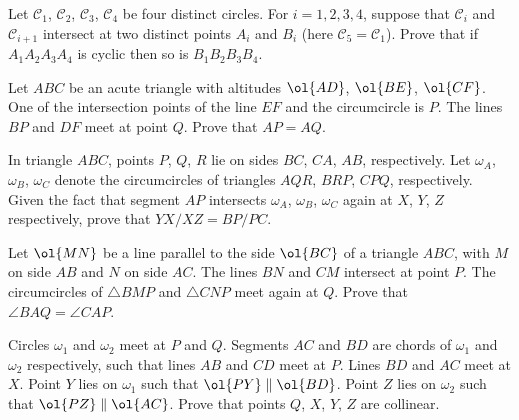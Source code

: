 \documentclass[11pt]{scrartcl}
\begin{document}
\begin{problem}
  [Folklore]
  Let $\mathcal C_1$, $\mathcal C_2$, $\mathcal C_3$, $\mathcal C_4$
  be four distinct circles.
  For $i=1,2,3,4$, suppose that $\mathcal C_i$ and $\mathcal C_{i+1}$
  intersect at two distinct points $A_i$ and $B_i$
  (here $\mathcal C_5 = \mathcal C_1$).
  Prove that if $A_1A_2A_3A_4$ is cyclic then so is $B_1B_2B_3B_4$.
\end{problem}
\begin{problem}
  [Shortlist 2010/G1]
  Let $ABC$ be an acute triangle with altitudes
  $\ol{AD}$, $\ol{BE}$, $\ol{CF}$.
  One of the intersection points of the line $EF$ and the circumcircle is $P$.
  The lines $BP$ and $DF$ meet at point $Q$.
  Prove that $AP = AQ$.
\end{problem}
\begin{problem}
  [USAMO 2013/1] In triangle $ABC$,
  points $P$, $Q$, $R$ lie on sides $BC$, $CA$, $AB$, respectively.
  Let $\omega_A$, $\omega_B$, $\omega_C$ denote the
  circumcircles of triangles $AQR$, $BRP$, $CPQ$, respectively.
  Given the fact that segment $AP$ intersects $\omega_A$, $\omega_B$, $\omega_C$
  again at $X$, $Y$, $Z$ respectively, prove that $YX/XZ=BP/PC$.
\end{problem}
\begin{problem}
  [Balkan 2009] Let $\ol{MN}$ be a line parallel to the side $\ol{BC}$ of a triangle $ABC$,
  with $M$ on side $AB$ and $N$ on side $AC$.
  The lines $BN$ and $CM$ intersect at point $P$.
  The circumcircles of $\triangle BMP$ and $\triangle CNP$ meet again at $Q$.
  Prove that $\angle BAQ = \angle CAP$.
\end{problem}
\begin{problem}
   Circles $\omega_1$ and $\omega_2$ meet at $P$ and $Q$.
  Segments $AC$ and $BD$ are chords of $\omega_1$ and $\omega_2$ respectively,
  such that lines $AB$ and $CD$ meet at $P$.
  Lines $BD$ and $AC$ meet at $X$.
  Point $Y$ lies on $\omega_1$ such that $\ol{PY} \parallel \ol{BD}$.
  Point $Z$ lies on $\omega_2$ such that $\ol{PZ} \parallel \ol{AC}$.
  Prove that points $Q$, $X$, $Y$, $Z$ are collinear.
\end{problem}
\end{document}

